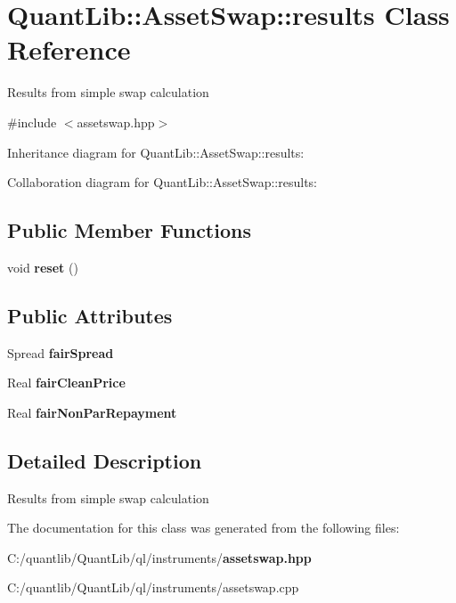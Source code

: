 \section{Quant\+Lib\+:\+:Asset\+Swap\+:\+:results Class Reference}
\label{class_quant_lib_1_1_asset_swap_1_1results}


Results from simple swap calculation  




{\ttfamily \#include $<$assetswap.\+hpp$>$}



Inheritance diagram for Quant\+Lib\+:\+:Asset\+Swap\+:\+:results\+:


Collaboration diagram for Quant\+Lib\+:\+:Asset\+Swap\+:\+:results\+:
\subsection*{Public Member Functions}
\begin{DoxyCompactItemize}
\item 
void {\bfseries reset} ()\label{class_quant_lib_1_1_asset_swap_1_1results_a9006e986def6778e5c7146d3e9ca6320}

\end{DoxyCompactItemize}
\subsection*{Public Attributes}
\begin{DoxyCompactItemize}
\item 
Spread {\bfseries fair\+Spread}\label{class_quant_lib_1_1_asset_swap_1_1results_ac1d16462ae85650f020d89c35ebd75ba}

\item 
Real {\bfseries fair\+Clean\+Price}\label{class_quant_lib_1_1_asset_swap_1_1results_ad4943b1b6e80293ac55ae8d1167bf608}

\item 
Real {\bfseries fair\+Non\+Par\+Repayment}\label{class_quant_lib_1_1_asset_swap_1_1results_ac154f5b05a318f2923a529a0fea102b3}

\end{DoxyCompactItemize}


\subsection{Detailed Description}
Results from simple swap calculation 

The documentation for this class was generated from the following files\+:\begin{DoxyCompactItemize}
\item 
C\+:/quantlib/\+Quant\+Lib/ql/instruments/{\bf assetswap.\+hpp}\item 
C\+:/quantlib/\+Quant\+Lib/ql/instruments/assetswap.\+cpp\end{DoxyCompactItemize}
